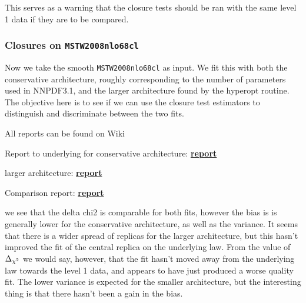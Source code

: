 This serves as a warning that the closure tests should be ran with the same level
1 data if they are to be compared.


\subsubsection*{Closures on \texttt{MSTW2008nlo68cl}}

Now we take the smooth \texttt{MSTW2008nlo68cl} as input. We fit this
with both the conservative architecture, roughly corresponding to the number of
parameters used in NNPDF3.1, and the larger architecture found by the hyperopt
routine. The objective here is to see if we can use the closure test estimators
to distinguish and discriminate between the two fits.

All reports can be found on Wiki

Report to underlying for conservative architecture:
\href{https://vp.nnpdf.science/9qr4qCK2RHePHehBpgxBdQ==/}{\bf{report}}

larger architecture:
\href{https://vp.nnpdf.science/pdm9Y1fjTw21nhlzjzErjw==/}{\bf{report}}

Comparison report:
\href{https://vp.nnpdf.science/lQjtB-lnRy263IhAYCTw1Q==/}{\bf{report}}

we see that the delta chi2 is comparable for both fits, however the bias is
is generally lower for the conservative architecture, as well as the variance.
It seems that there is a wider spread of replicas for the larger architecture,
but this hasn't improved the fit of the central replica on the underlying law.
From the value of $\Delta_{\chi^{2}}$ we would say, however, that the fit hasn't moved away
from the underlying law towards the level 1 data, and appears to have just
produced a worse quality fit. The lower variance is expected for the smaller
architecture, but the interesting thing is that there hasn't been a gain in
the bias.
